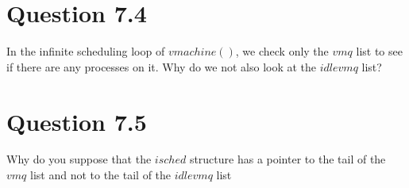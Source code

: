 \documentclass{article}
\begin{document}
\section*{Question 7.4}
In the infinite scheduling loop of $vmachine()$, we check only the $vmq$ list to see if there are any processes on it. Why do we not also look at the $idlevmq$ list?

\section*{Question 7.5}
Why do you suppose that the $isched$ structure has a pointer to the tail of the $vmq$ list and not to the tail of the $idlevmq$ list
\end{document}
